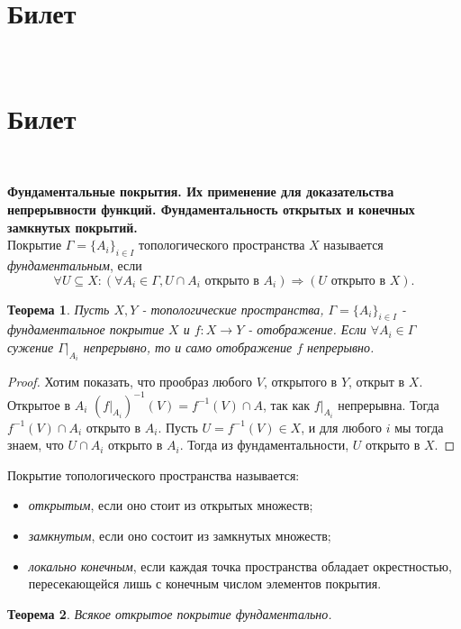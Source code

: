 \documentclass[a4paper,100pt]{article}
\theoremstyle{indented}
\newtheorem{theorem}{Теорема}
\begin{document}
\section{Билет} \

\section{Билет} \

\medskip

\textbf{Фундаментальные покрытия. Их применение для доказательства непрерывности функций. Фундаментальность открытых и конечных замкнутых покрытий.}\\

Покрытие $\Gamma = \{A_i\}_{i\in I}$ топологического пространства $X$ называется \textit{фундаментальным}, если 
\[
    \forall U\subseteq X : (\forall A_i \in \Gamma, U\cap A_i \text{ открыто в } A_i) \Rightarrow (U \text{ открыто в } X).
\] 

\begin{theorem}
    Пусть $X, Y$ - топологические пространства, $\Gamma = \{A_i\}_{i\in I}$ - фундаментальное покрытие $X$ и $f: X\rightarrow Y$ - отображение. Если $\forall A_i \in \Gamma$ сужение $\Gamma |_{A_i}$ непрерывно, то и само отображение $f$ непрерывно.
\end{theorem}

\begin{proof}
    Хотим показать, что прообраз любого $V$, открытого в $Y$, открыт в $X$. Открытое в $A_i$ $(f|_{A_i})^{-1}(V)=f^{-1}(V)\cap A$, так как $f|_{A_i}$ непрерывна. Тогда $f^{-1}(V)\cap A_i$ открыто в $A_i$. Пусть $U = f^{-1}(V)\in X$, и для любого $i$ мы тогда знаем, что $U\cap A_i$ открыто в $A_i$. Тогда из фундаментальности, $U$ открыто в $X$.
\end{proof}

Покрытие топологического пространства называется:
\begin{itemize}
    \item \textit{открытым}, если оно стоит из открытых множеств;
    \item \textit{замкнутым}, если оно состоит из замкнутых множеств;
    \item \textit{локально конечным}, если каждая точка пространства обладает окрестностью, пересекающейся лишь с конечным числом элементов покрытия.
\end{itemize}

\begin{theorem}
    Всякое открытое покрытие фундаментально.
\end{theorem}
\end{document}
